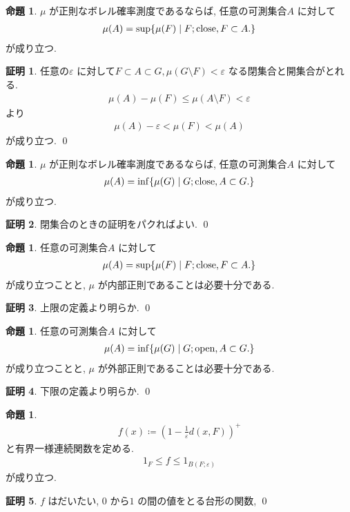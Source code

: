 \documentclass[10pt, fleqn, label-section=none]{bxjsarticle}
\theoremstyle{definition}
\newtheorem{prop}[dfn]{命題}
\newtheorem*{pf*}{証明}
\newcommand{\veps}{\varepsilon}
\newcommand{\cbra}[1]{\mleft\{#1\mright\}}
\renewcommand{\;}{\, ; \,}
\begin{document}
\begin{prop}
$\mu$ が正則なボレル確率測度であるならば, 任意の可測集合$A$ に対して
\begin{align*} \mu(A) = \sup \cbra{\mu (F) \mid F;\textrm{close}, F \subset A. }\end{align*}
が成り立つ. 
\end{prop}
\begin{pf*}
任意の$\veps $ に対して$F \subset A \subset G, \mu (G \setminus F) < \veps$ なる閉集合と開集合がとれる. 
\begin{align*} \mu(A) - \mu(F) \leq  \mu(A \setminus F) < \veps \end{align*} 
より
\begin{align*} \mu(A) - \veps < \mu(F) < \mu(A) \end{align*}
が成り立つ.
\qed
\end{pf*}

\begin{prop}
$\mu$ が正則なボレル確率測度であるならば, 任意の可測集合$A$ に対して
\begin{align*} \mu(A) = \inf \cbra{\mu (G) \mid G;\textrm{close}, A \subset G. }\end{align*}
が成り立つ. 
\end{prop}
\begin{pf*}
閉集合のときの証明をパクればよい.
\qed
\end{pf*}

\begin{prop}
任意の可測集合$A$ に対して
\begin{align*} \mu(A) = \sup \cbra{\mu (F) \mid F;\textrm{close}, F \subset A. }   \end{align*}
が成り立つことと, $\mu$ が内部正則であることは必要十分である.
\end{prop}
\begin{pf*}
上限の定義より明らか.
\qed
\end{pf*}

\begin{prop}
任意の可測集合$A$ に対して
\begin{align*} \mu(A) = \inf \cbra{\mu (G) \mid G;\textrm{open}, A \subset G. }\end{align*}
が成り立つことと, $\mu$ が外部正則であることは必要十分である.
\end{prop}
\begin{pf*}
下限の定義より明らか.
\qed
\end{pf*}



\begin{prop}
\begin{align*} f(x) \coloneqq (1 - \frac{1}{\veps} d(x, F))^+  \end{align*}
と有界一様連続関数を定める. 
\begin{align*} 1_{F} \leq f \leq 1_{     B(F; \veps)      } \end{align*}
が成り立つ.
\end{prop}
\begin{pf*}
$f$ はだいたい, $0$ から$1$ の間の値をとる台形の関数, 
\qed
\end{pf*}
\end{document}
